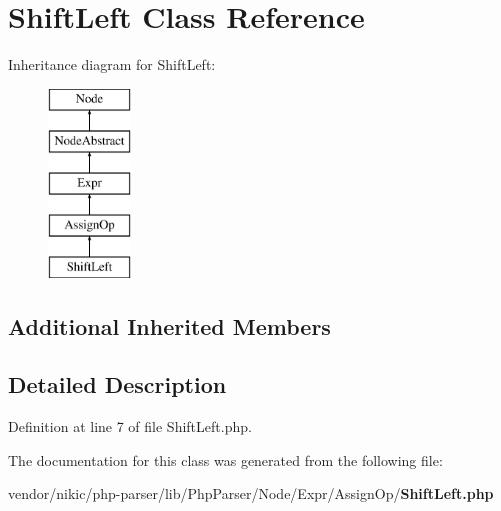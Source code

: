 \section{Shift\+Left Class Reference}
\label{class_php_parser_1_1_node_1_1_expr_1_1_assign_op_1_1_shift_left}
Inheritance diagram for Shift\+Left\+:\begin{figure}[H]
\begin{center}
\leavevmode
\includegraphics[height=5.000000cm]{class_php_parser_1_1_node_1_1_expr_1_1_assign_op_1_1_shift_left}
\end{center}
\end{figure}
\subsection*{Additional Inherited Members}


\subsection{Detailed Description}


Definition at line 7 of file Shift\+Left.\+php.



The documentation for this class was generated from the following file\+:\begin{DoxyCompactItemize}
\item 
vendor/nikic/php-\/parser/lib/\+Php\+Parser/\+Node/\+Expr/\+Assign\+Op/{\bf Shift\+Left.\+php}\end{DoxyCompactItemize}
